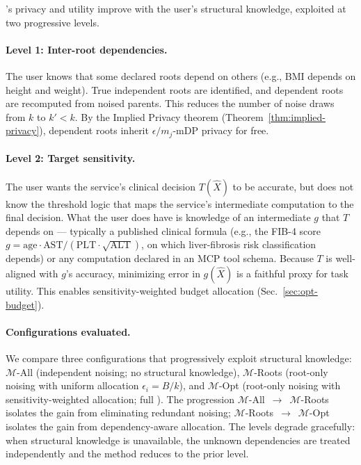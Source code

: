 \sysname{}'s privacy and utility improve with the user's structural knowledge, exploited at two progressive levels.
 
\paragraph{Level 1: Inter-root dependencies.} The user knows that some declared roots depend on others (e.g., BMI depends on height and weight). True independent roots are identified, and dependent roots are recomputed from noised parents. This reduces the number of noise draws from $k$ to $k' < k$. By the Implied Privacy theorem (Theorem~\ref{thm:implied-privacy}), dependent roots inherit $\epsilon/m_j$-mDP privacy for free.
 
\paragraph{Level 2: Target sensitivity.} The user wants the service's clinical decision $T(\hat{X})$ to be accurate, but does not know the threshold logic that maps the service's intermediate computation to the final decision. What the user does have is knowledge of an intermediate $g$ that $T$ depends on --- typically a published clinical formula (e.g., the FIB-4 score $g = \text{age} \cdot \text{AST} / (\text{PLT} \cdot \sqrt{\text{ALT}})$, on which liver-fibrosis risk classification depends) or any computation declared in an MCP tool schema. Because $T$ is well-aligned with $g$'s accuracy, minimizing error in $g(\hat{X})$ is a faithful proxy for task utility. This enables sensitivity-weighted budget allocation (Sec.~\ref{sec:opt-budget}).
 
\paragraph{Configurations evaluated.} We compare three configurations that progressively exploit structural knowledge: $\mathcal{M}$-All (independent noising; no structural knowledge), $\mathcal{M}$-Roots (root-only noising with uniform allocation $\epsilon_i = B/k$), and $\mathcal{M}$-Opt (root-only noising with sensitivity-weighted allocation; full \sysname{}). The progression $\mathcal{M}$-All~$\to$~$\mathcal{M}$-Roots isolates the gain from eliminating redundant noising; $\mathcal{M}$-Roots~$\to$~$\mathcal{M}$-Opt isolates the gain from dependency-aware allocation. The levels degrade gracefully: when structural knowledge is unavailable, the unknown dependencies are treated independently and the method reduces to the prior level.

